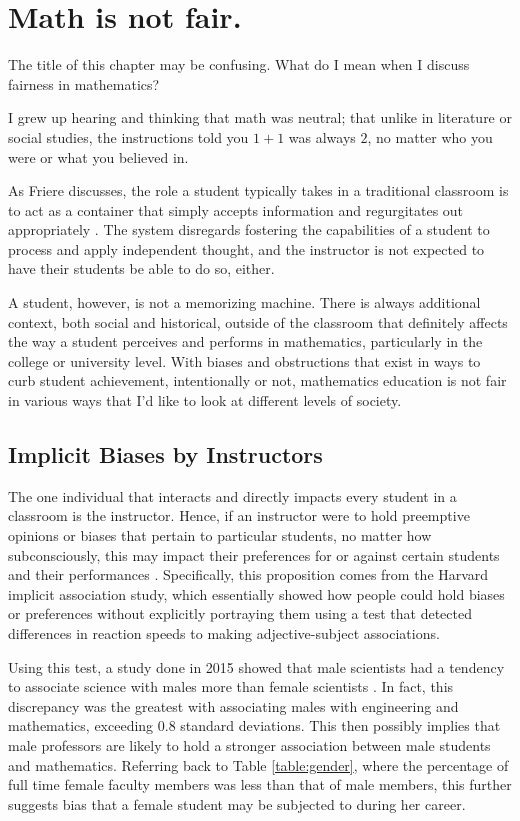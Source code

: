 \chapter{Math is not fair.}

The title of this chapter may be confusing. What do I mean when I discuss fairness in mathematics?

I grew up hearing and thinking that math was neutral; that unlike in literature or social studies, the instructions told you $1+1$ was always $2$, no matter who you were or what you believed in.

As Friere discusses, the role a student typically takes in a traditional classroom is to act as a container that simply accepts information and regurgitates out appropriately 
\citep{freire_pedagogy_2014}. The system disregards fostering the capabilities of a student to process and apply independent thought, and the instructor is not expected to have their students be able to do so, either.

A student, however, is not a memorizing machine. There is always additional context, both social and historical, outside of the classroom that definitely affects the way a student perceives and performs in mathematics, particularly in the college or university level. With biases and obstructions that exist in ways to curb student achievement, intentionally or not, mathematics education is not fair in various ways that I'd like to look at different levels of society.

\section{Implicit Biases by Instructors}
The one individual that interacts and directly impacts every student in a classroom is the instructor. Hence, if an instructor were to hold preemptive opinions or biases that pertain to particular students, no matter how subconsciously, this may impact their preferences for or against certain students and their performances \citep{green_implicit_2007}. Specifically, this proposition comes from the Harvard implicit association study, which essentially showed how people could hold biases or preferences without explicitly portraying them using a test that detected differences in reaction speeds to making adjective-subject associations.

Using this test, a study done in 2015 showed that male scientists had a tendency to associate science with males more than female scientists \citep{smyth_genderscience_2015}. In fact, this discrepancy was the greatest with associating males with engineering and mathematics, exceeding 0.8 standard deviations. This then possibly implies that male professors are likely to hold a stronger association between male students and mathematics. Referring back to Table \ref{table:gender}, where the percentage of full time female faculty members was less than that of male members, this further suggests bias that a female student may be subjected to during her career.

